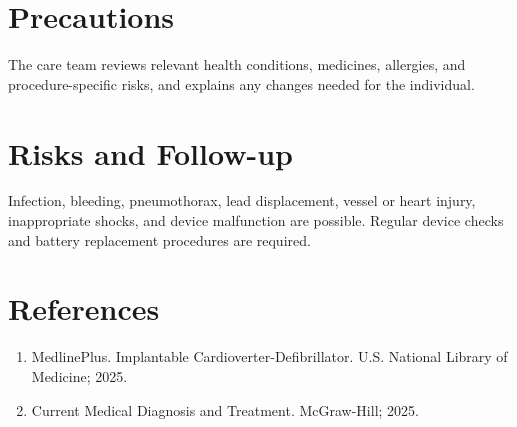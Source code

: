 \section*{Precautions}
The care team reviews relevant health conditions, medicines, allergies, and procedure-specific risks, and explains any changes needed for the individual.

\section*{Risks and Follow-up}
Infection, bleeding, pneumothorax, lead displacement, vessel or heart injury, inappropriate shocks, and device malfunction are possible. Regular device checks and battery replacement procedures are required.

\section*{References}
\begin{enumerate}
  \item MedlinePlus. Implantable Cardioverter-Defibrillator. U.S. National Library of Medicine; 2025.
  \item Current Medical Diagnosis and Treatment. McGraw-Hill; 2025.
\end{enumerate}
\clearpage
